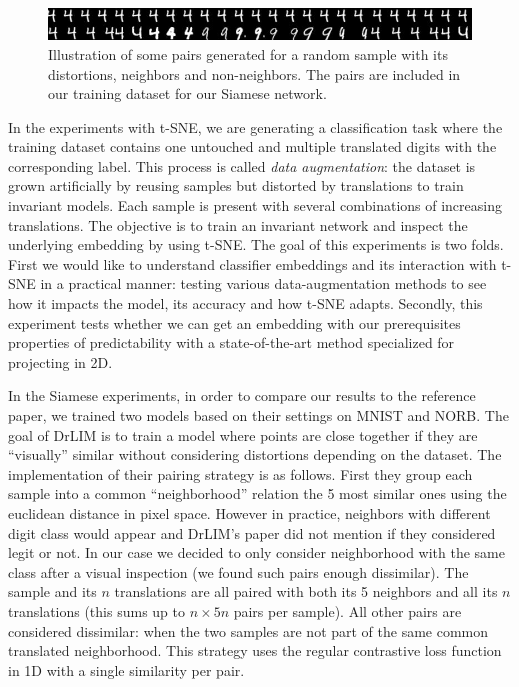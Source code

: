 \documentclass[a4paper,12pt]{report}
\begin{document}
\begin{figure}[t]
    \begin{center}
        \includegraphics{thesis_figures/mnist_pairs.jpg}
    \end{center}
    \caption{Illustration of some pairs generated for a random sample with its distortions, neighbors and non-neighbors. The pairs are included in our training dataset for our Siamese network.}
    \label{fig:mnist_pairs}
\end{figure}

In the experiments with t-SNE, we are generating a classification task where the training dataset contains one untouched and multiple translated digits with the corresponding label.
This process is called {\em data augmentation}: the dataset is grown artificially by reusing samples but distorted by translations to train invariant models.
Each sample is present with several combinations of increasing translations.
The objective is to train an invariant network and inspect the underlying embedding by using t-SNE.
The goal of this experiments is two folds.
First we would like to understand classifier embeddings and its interaction with t-SNE in a practical manner: testing various data-augmentation methods to see how it impacts the model, its accuracy and how t-SNE adapts.
Secondly, this experiment tests whether we can get an embedding with our prerequisites properties of predictability with a state-of-the-art method specialized for projecting in 2D.

In the Siamese experiments, in order to compare our results to the reference paper, we trained two models based on their settings on MNIST and NORB.
The goal of DrLIM is to train a model where points are close together if they are ``visually'' similar without considering distortions depending on the dataset.
The implementation of their pairing strategy is as follows.
First they group each sample into a common ``neighborhood'' relation the 5 most similar ones using the euclidean distance in pixel space.
However in practice, neighbors with different digit class would appear and DrLIM's paper did not mention if they considered legit or not.
In our case we decided to only consider neighborhood with the same class after a visual inspection (we found such pairs enough dissimilar).
The sample and its $n$ translations are all paired with both its 5 neighbors and all its $n$ translations (this sums up to $n \times 5n$ pairs per sample).
All other pairs are considered dissimilar: when the two samples are not part of the same common translated neighborhood.
This strategy uses the regular contrastive loss function in 1D with a single similarity per pair.
\end{document}
